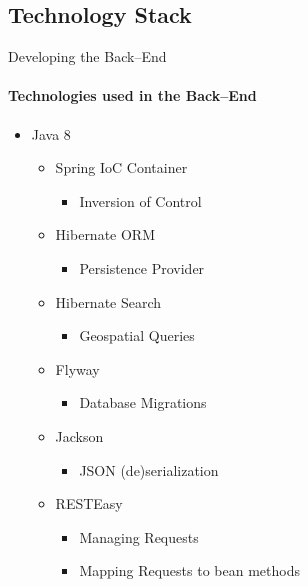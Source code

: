     \subsection{Technology Stack}
        \begin{frame}[t]{Developing the Back--End}\framesubtitle{Technologies used in the Back--End}
             \begin{itemize}
                 \item Java 8
                 \begin{itemize}
                    \item Spring IoC Container
                    \begin{itemize}
                        \item Inversion of Control
                    \end{itemize}
                    \item Hibernate ORM
                    \begin{itemize}
                        \item Persistence Provider
                    \end{itemize}
                    \item Hibernate Search
                    \begin{itemize}
                        \item Geospatial Queries
                    \end{itemize}
                    \item Flyway
                    \begin{itemize}
                        \item Database Migrations
                    \end{itemize}
                    \item Jackson
                    \begin{itemize}
                        \item JSON (de)serialization 
                    \end{itemize}
                    \item RESTEasy
                    \begin{itemize}
                        \item Managing Requests
                        \item Mapping Requests to bean methods
                    \end{itemize}
                 \end{itemize}
             \end{itemize}
        \end{frame}
